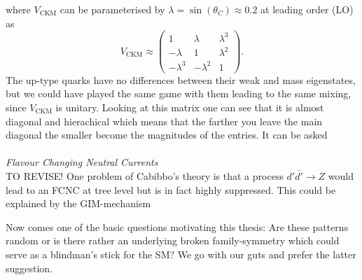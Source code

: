 \noindent
where $V_\text{CKM}$ can be parameterised by $\lambda = \sin(\theta_C) \approx 0.2$ at leading order (LO) as
\begin{equation}
 V_\text{CKM} \approx \begin{pmatrix}
  1 & \lambda & \lambda^3\\
  -\lambda & 1 & \lambda^2\\
  -\lambda^3 & -\lambda^2 & 1
 \end{pmatrix}.
\end{equation}
The up-type quarks have no differences between their weak and mass eigenstates, but we could have played the same game with them leading to the 
same mixing, since $V_\text{CKM}$ is unitary. Looking at this matrix one can see that it is almost diagonal and hierachical which
means that the farther you leave the main diagonal the smaller become the magnitudes of the entries. It can be asked 
\\ \\ \textit{Flavour Changing Neutral Currents}\\
\noindent TO REVISE!
One problem of Cabibbo's theory is that a process $d'\bar {d'} \rightarrow Z$ would lead to an FCNC at tree level but is in fact highly suppressed. This
could be explained by the GIM-mechanism 


Now comes one of the basic questions motivating this thesis: Are these patterns random or is there rather an underlying broken family-symmetry which
could serve as a blindman's stick for the SM? We go with our guts and prefer the latter suggestion.

